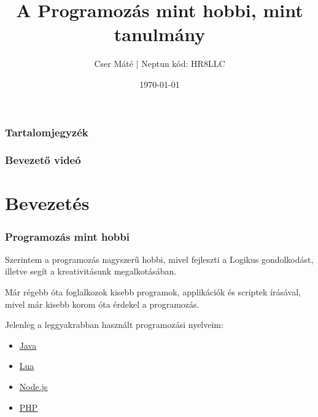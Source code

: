 \documentclass[10pt]{beamer}
\newcommand{\hyperstyle}[1]{{\color{hyperpurple}\underline{#1}}}
\begin{document}
	\begin{frame}
		\title{A Programozás mint hobbi, mint tanulmány}
		\author{Cser Máté | Neptun kód: HR8LLC}
		\date{\today}

		\titlepage %
	\end{frame}

	\begin{frame}
		\frametitle{Tartalomjegyzék}
		\setcounter{tocdepth}{1}
		\tableofcontents[pausesections]
	\end{frame}

	\begin{frame}
		\frametitle{Bevezető videó}

		 \pause
	\end{frame}

	\section{Bevezetés}
	\begin{frame}
		\frametitle{Programozás mint hobbi}

		\transdissolve \hspace{0.25cm} Szerintem a programozás nagyszerű hobbi, mivel
		fejleszti a Logikus gondolkodást, illetve segít a kreativitásunk
		megalkotásában. \pause

		\vspace{0.5cm}
		\hspace{0.25cm} Már régebb óta foglalkozok kisebb programok, applikációk és scriptek
		írásával, mivel már kisebb korom óta érdekel a programozás. \pause

		Jelenleg a leggyakrabban használt programozási nyelveim:

		\transdissolve
		\begin{itemize}
			\item \hyperstyle{ \hyperlink{java}{Java} } \pause

			\item \hyperstyle{ \hyperlink{lua}{Lua} } \pause

			\item \hyperstyle{ \hyperlink{nodejs}{Node.js} } \pause

			\item \hyperstyle{ \hyperlink{php}{PHP} } \pause
		\end{itemize}
	\end{frame}
\end{document}

